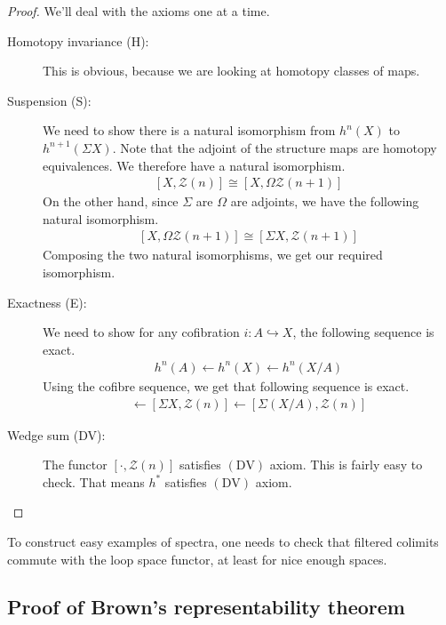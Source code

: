\documentclass[12pt, notitlepage]{article}
\theoremstyle{definition}
\newcommand{\calz}{\mathcal{Z}}
\begin{document}
\begin{proof}
  We'll deal with the axioms one at a time.
  \begin{description}
  \item[Homotopy invariance (H):] This is obvious, because we are looking at homotopy classes of
    maps.
  \item[Suspension (S):] We need to show there is a natural isomorphism from $h^n(X)$ to
    $h^{n+1}(\Sigma X)$. Note that the adjoint of the structure maps are homotopy equivalences.  We
    therefore have a natural isomorphism.
    \begin{align*}
      \left[ X, \calz(n) \right] \cong \left[ X, \Omega \calz(n+1) \right]
    \end{align*}
    On the other hand, since $\Sigma$ are $\Omega$ are adjoints, we have the following natural
    isomorphism.
    \begin{align*}
      \left[ X, \Omega \calz(n+1) \right] \cong \left[ \Sigma X, \calz(n+1) \right]
    \end{align*}
    Composing the two natural isomorphisms, we get our required isomorphism.
  \item[Exactness (E):] We need to show for any cofibration $i: A \hookrightarrow X$, the following
    sequence is exact.
    \begin{align*}
      h^n(A) \leftarrow h^n(X) \leftarrow h^n\left( X/A \right)
    \end{align*}
    Using the cofibre sequence, we get that following sequence is exact.
    \begin{align*}
      [\Sigma A, \calz(n)] \leftarrow [\Sigma X, \calz(n)] \leftarrow \left[\Sigma \left(X/A\right), \calz(n) \right]
    \end{align*}
  \item[Wedge sum (DV):] The functor $[\cdot, \calz(n)]$ satisfies $(\mathrm{DV})$ axiom. This is
    fairly easy to check. That means $h^{\ast}$ satisfies $(\mathrm{DV})$ axiom.
  \end{description}
\end{proof}

{\color{red} To construct easy examples of spectra, one needs to check that filtered colimits
  commute with the loop space functor, at least for nice enough spaces.}

\subsection{Proof of Brown's representability theorem}
\label{sec:proof-browns-repr}
\end{document}
